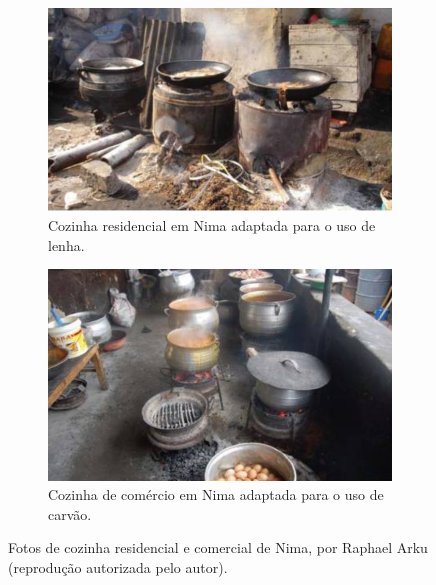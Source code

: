 \begin{figure}[H]
  \centering
  \begin{subfigure}[b]{0.4\linewidth}
    \includegraphics[width=\linewidth]{../inputs/images/zheng/arku1.jpeg}
    \caption{Cozinha residencial em Nima adaptada para o uso de lenha.}
  \end{subfigure}%
  \hspace{0.5cm}
  \begin{subfigure}[b]{0.4\linewidth}
    \includegraphics[width=\linewidth]{../inputs/images/zheng/arku2.jpeg}
    \caption{Cozinha de comércio em Nima adaptada para o uso de carvão.}
  \end{subfigure}
  \caption{Fotos de cozinha residencial e comercial de Nima, por Raphael Arku 
           (reprodução autorizada pelo autor). \label{fig:nima}}
\end{figure}
